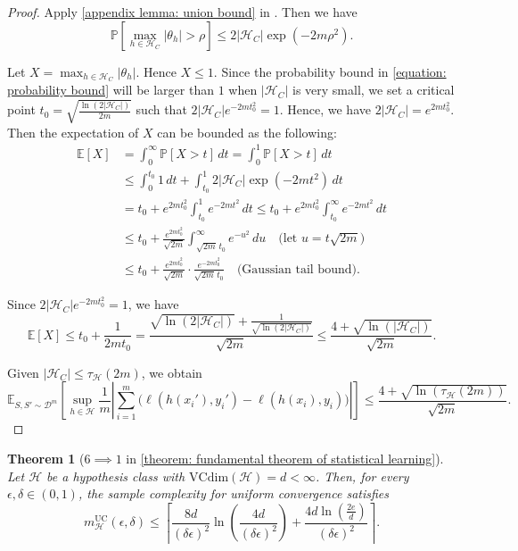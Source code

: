 \documentclass[openany, amssymb, psamsfonts]{amsart}
\newtheorem{thm}{Theorem}[section]
\theoremstyle{definition}
\numberwithin{equation}{section}
\begin{document}
\begin{proof}
Apply \autoref{appendix lemma: union bound} in . Then we have
\begin{equation} \label{equation: probability bound}
\mathbb{P}\left[ \max_{h \in \mathcal{H}_C} |\theta_h| > \rho \right] \leq 2|\mathcal{H}_C| \exp(-2m\rho^2).
\end{equation}

Let $X = \max_{h \in \mathcal{H}_C} |\theta_h|$. Hence $X \leq 1$.
Since the probability bound in \autoref{equation: probability bound} 
will be larger than $1$ when $|\mathcal{H}_C|$ is very small, we 
set a critical point $t_0 = \sqrt{\frac{\ln(2|\mathcal{H}_C|)}{2m}}$ such that 
$2|\mathcal{H}_C| e^{-2m t_0^2} = 1$. Hence, we have $2|\mathcal{H}_C| = e^{2m t_0^2}$. Then the expectation of $X$ can be bounded as the following:
\begin{align*}
\mathbb{E}[X] &= \int_0^\infty \mathbb{P}[X > t] \, dt = \int_0^1 \mathbb{P}[X > t] \, dt \\
&\leq \int_0^{t_0} 1 \, dt + \int_{t_0}^1 2|\mathcal{H}_C| \exp(-2m t^2) \, dt \\
&= t_0 + e^{2m t_0^2} \int_{t_0}^1 e^{-2m t^2} \, dt \leq t_0 + e^{2m t_0^2} \int_{t_0}^\infty e^{-2m t^2} \, dt \\
&\leq t_0 + \frac{e^{2m t_0^2}}{\sqrt{2m}} \int_{\sqrt{2m}\, t_0}^\infty e^{-u^2} \, du \quad \text{(let $u = t\sqrt{2m}$)} \\
&\leq t_0 + \frac{e^{2m t_0^2}}{\sqrt{2m}} \cdot \frac{e^{-2m t_0^2}}{\sqrt{2m}\, t_0} \quad \text{(Gaussian tail bound)}.
\end{align*}

Since $2|\mathcal{H}_C| e^{-2m t_0^2} = 1$, we have
\[
\mathbb{E}[X] \leq t_0 + \frac{1}{2m t_0} = \frac{\sqrt{\ln(2|\mathcal{H}_C|)} + \frac{1}{\sqrt{\ln(2|\mathcal{H}_C|)}}}{\sqrt{2m}} \leq \frac{4 + \sqrt{\ln(|\mathcal{H}_C|)}}{\sqrt{2m}}.
\]

Given $|\mathcal{H}_C| \leq \tau_{\mathcal{H}}(2m)$, we obtain
\[
\mathbb{E}_{S,S'\sim \mathcal{D}^m} \left[ \sup_{h \in \mathcal{H}} \frac{1}{m} \left| \sum_{i=1}^m \bigl(\ell(h(x_i'), y_i') - \ell(h(x_i), y_i)\bigr) \right| \right] \leq \frac{4 + \sqrt{\ln(\tau_{\mathcal{H}}(2m))}}{\sqrt{2m}}.
\]
\end{proof}

\begin{thm}[$6 \implies 1$ in \autoref{theorem: fundamental theorem of statistical learning}]
Let $\mathcal{H}$ be a hypothesis class with $\mathrm{VCdim}(\mathcal{H}) = d < \infty$.
Then, for every $\epsilon, \delta \in (0,1)$, the sample complexity for uniform convergence satisfies
\[
m_{\mathcal{H}}^{\text{UC}}(\epsilon, \delta) \leq \left\lceil\frac{8d}{(\delta \epsilon)^2} \ln\left( \frac{4d}{(\delta \epsilon)^2} \right) + \frac{4d \ln\left(\frac{2e}{d}\right)}{(\delta \epsilon)^2} \right\rceil.
\]
\end{thm}
\end{document}
